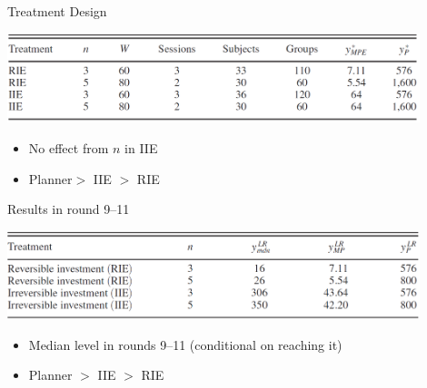 \documentclass{beamer}
\begin{document}
\begin{frame}{Treatment Design}
\begin{card}
    \begin{center}
        \includegraphics[width=0.9\textwidth]{./i/BNPtbl1.png}
    \end{center}
\end{card}
\begin{card}
	\begin{itemize}
	\item No effect from $n$ in  IIE
	\item Planner$>$ IIE $>$ RIE
	\end{itemize}
\end{card}
\end{frame}

\begin{frame}{Results in round 9--11}
\begin{card}
    \begin{center}
        \includegraphics[width=0.9\textwidth]{./i/BNPtbl2.png}
    \end{center}
\end{card}
\begin{card}
	\begin{itemize}
    	\item Median level in rounds 9--11 (conditional on reaching it)
    	\item Planner $>$ IIE $>$ RIE
	\end{itemize}
\end{card}
\end{frame}
\end{document}
